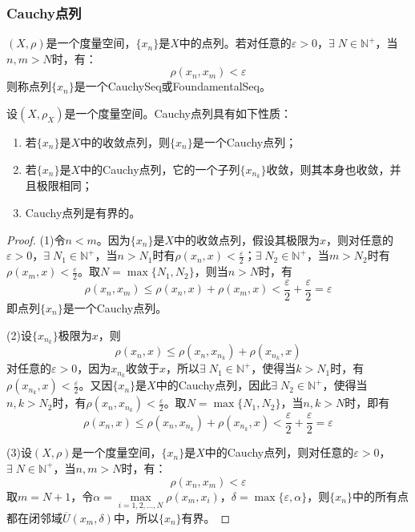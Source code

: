 \subsubsection{Cauchy点列}
\begin{definition}
	$(X,\rho)$是一个度量空间，$\{x_n\}$是$X$中的点列。若对任意的$\varepsilon>0$，$\exists\;N\in\mathbb{N}^+$，当$n,m>N$时，有：
	\begin{equation*}
		\rho(x_n,x_m)<\varepsilon
	\end{equation*}
	则称点列$\{x_n\}$是一个\gls{CauchySeq}或\gls{FoundamentalSeq}。
\end{definition}
\begin{property}\label{prop:CauchySeq}
	设$(X,\rho_X)$是一个度量空间。Cauchy点列具有如下性质：
	\begin{enumerate}
		\item 若$\{x_n\}$是$X$中的收敛点列，则$\{x_n\}$是一个Cauchy点列；
		\item 若$\{x_n\}$是$X$中的Cauchy点列，它的一个子列$\{x_{n_k}\}$收敛，则其本身也收敛，并且极限相同；
		\item Cauchy点列是有界的。
	\end{enumerate}
\end{property}
\begin{proof}
	(1)令$n<m$。因为$\{x_n\}$是$X$中的收敛点列，假设其极限为$x$，则对任意的$\varepsilon>0$，$\exists\; N_1\in\mathbb{N}^+$，当$n>N_1$时有$\rho(x_n,x)<\frac{\varepsilon}{2}$；$\exists\; N_2\in\mathbb{N}^+$，当$m>N_2$时有$\rho(x_m,x)<\frac{\varepsilon}{2}$。取$N=\max\{N_1,N_2\}$，则当$n>N$时，有
	\begin{equation*}
		\rho(x_n,x_m)\leqslant\rho(x_n,x)+\rho(x_m,x)<\frac{\varepsilon}{2}+\frac{\varepsilon}{2}=\varepsilon
	\end{equation*}
	即点列$\{x_n\}$是一个Cauchy点列。\par
	(2)设$\{x_{n_k}\}$极限为$x$，则
	\begin{equation*}
		\rho(x_n,x)\leqslant\rho(x_n,x_{n_k})+\rho(x_{n_k},x)
	\end{equation*}
	对任意的$\varepsilon>0$，因为$x_{n_k}$收敛于$x$，所以$\exists\;N_1\in\mathbb{N}^+$，使得当$k>N_1$时，有$\rho(x_{n_k},x)<\frac{\varepsilon}{2}$。又因$\{x_n\}$是$X$中的Cauchy点列，因此$\exists\;N_2\in\mathbb{N}^+$，使得当$n,k>N_2$时，有$\rho(x_n,x_{n_k})<\frac{\varepsilon}{2}$。取$N=\max\{N_1,N_2\}$，当$n,k>N$时，即有
	\begin{equation*}
		\rho(x_n,x)\leqslant\rho(x_n,x_{n_k})+\rho(x_{n_k},x)<\frac{\varepsilon}{2}+\frac{\varepsilon}{2}=\varepsilon
	\end{equation*}\par
	(3)设$(X,\rho)$是一个度量空间，$\{x_n\}$是$X$中的Cauchy点列，则对任意的$\varepsilon>0$，$\exists\;N\in\mathbb{N}^+$，当$n,m>N$时，有：
	\begin{equation*}
		\rho(x_n,x_m)<\varepsilon
	\end{equation*}
	取$m=N+1$，令$\alpha=\max\limits_{i=1,2,\dots,N}\rho(x_m,x_i)$，$\delta=\max\{\varepsilon,\alpha\}$，则$\{x_n\}$中的所有点都在闭邻域$\overline{U}(x_m,\delta)$中，所以$\{x_n\}$有界。
\end{proof}
